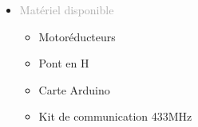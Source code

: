\documentclass{article}
\begin{document}
\begin{tabular}
\begin{itemize}
\begin{itemize}
        \end{itemize}
        \item \textcolor{darkGray}{Matériel disponible}
        \begin{itemize}
            [label={\textcolor{gray!80}{\checkmark}}, topsep=8pt, partopsep=0pt, itemsep=0.5pt, parsep=2pt,after=\vspace*{-\baselineskip}] 
            \item \textcolor{gray!80}{Motoréducteurs}
            \item \textcolor{gray!80}{Pont en H}
            \item \textcolor{gray!80}{Carte Arduino}
            \item \textcolor{gray!80}{Kit de communication 433MHz}
        \end{itemize}
    \end{itemize}
\end{tabular}

\vfill %
\end{document}
